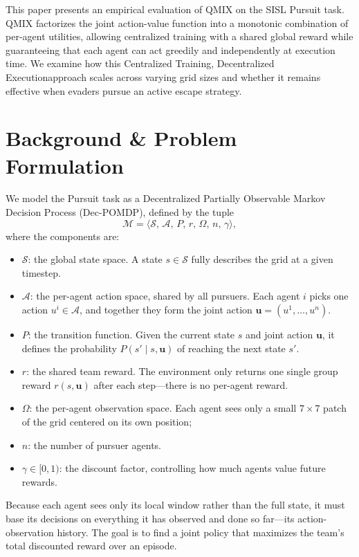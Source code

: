 \documentclass[sigconf,screen]{acmart}
\begin{document}
This paper presents an empirical evaluation of QMIX on the SISL Pursuit task. QMIX factorizes the joint action-value function into a monotonic combination of per-agent utilities, allowing centralized training with a shared global reward while guaranteeing that each agent can act greedily and independently at execution time. We examine how this Centralized Training, Decentralized Executionapproach scales across varying grid sizes and whether it remains effective when evaders pursue an active escape strategy.

\section{Background \& Problem Formulation}

We model the Pursuit task as a Decentralized Partially Observable Markov Decision Process (Dec-POMDP), defined by the tuple
\[
  \mathcal{M} = \langle \mathcal{S},\, \mathcal{A},\, P,\, r,\, \Omega,\, n,\, \gamma \rangle,
\]
where the components are:
\begin{itemize}[leftmargin=*]
  \item $\mathcal{S}$: the global state space. A state $s \in \mathcal{S}$ fully describes the grid at a given timestep.
  \item $\mathcal{A}$: the per-agent action space, shared by all pursuers. Each agent $i$ picks one action $u^i \in \mathcal{A}$, and together they form the joint action $\mathbf{u} = (u^1,\dots,u^n)$.
  \item $P$: the transition function. Given the current state $s$ and joint action $\mathbf{u}$, it defines the probability $P(s' \mid s, \mathbf{u})$ of reaching the next state $s'$.
  \item $r$: the shared team reward. The environment only returns one single group reward $r(s, \mathbf{u})$ after each step—there is no per-agent reward.
  \item $\Omega$: the per-agent observation space. Each agent sees only a small $7{\times}7$ patch of the grid centered on its own position;
  \item $n$: the number of pursuer agents.
  \item $\gamma \in [0,1)$: the discount factor, controlling how much agents value future rewards.
\end{itemize}
Because each agent sees only its local window rather than the full state, it must base its decisions on everything it has observed and done so far—its action-observation history. The goal is to find a joint policy that maximizes the team's total discounted reward over an episode.
\end{document}
